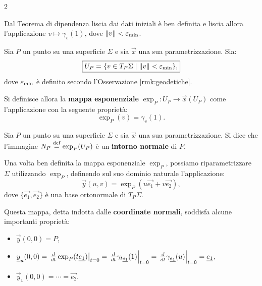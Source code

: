 \begin{multicols*}{2}
\begin{remark}
        Dal Teorema di dipendenza liscia dai dati iniziali è ben definita e liscia allora l'applicazione
        $v \mapsto \gamma_v(1)$, dove $\left\lVert v \right\rVert < \varepsilon_{\textnormal{min}}$.
    \end{remark}

    \begin{definition}
        Sia $P$ un punto su una superficie $\Sigma$ e sia $\vec{x}$ una sua parametrizzazione.
        Sia:
        \[
            \boxed{U_P = \{ v \in T_P \Sigma \mid \left\lVert v \right\rVert < \varepsilon_{\textnormal{min}} \},}
        \]
        dove $\varepsilon_{\textnormal{min}}$ è definito secondo l'Osservazione \ref{rmk:geodetiche}. \smallskip

        Si definisce allora la \textbf{mappa esponenziale} $\exp_P : U_P \to \vec{x}(U_P)$ come l'applicazione
        con la seguente proprietà:
        \[
            \boxed{\exp_P(v) = \gamma_v(1).}
        \]
    \end{definition}

    \begin{definition}
        Sia $P$ un punto su una superficie $\Sigma$ e sia $\vec{x}$ una sua parametrizzazione.
        Si dice che l'immagine $N_P \overset{\mathrm{def}}{=} \exp_P(U_P)$ è un \textbf{intorno normale} di $P$.
    \end{definition}

    \begin{remark}
        Una volta ben definita la mappa esponenziale $\exp_P$, possiamo riparametrizzare
        $\Sigma$ utilizzando $\exp_P$, definendo sul suo dominio naturale l'applicazione:
        \[
            \vec{y}(u, v) = \exp_P(u \vec{e_1} + v \vec{e_2}),
        \]
        dove $\{\vec{e_1}, \vec{e_2}\}$ è una base ortonormale di $T_P \Sigma$. \smallskip

        Questa mappa, detta indotta dalle \textbf{coordinate normali}, soddisfa alcune
        importanti proprietà:
        \begin{itemize}
            \item $\vec{y}(0, 0) = P$,
            \item $\vec{y}_u(0, 0) = \dertime{\exp_P(t \vec{e_1})}{t=0} =
                      \dertime{\gamma_{t \vec{e_1}}(1)}{t=0} =
                      \dertime{\gamma_{\vec{e_1}} (u)}{t=0} = \vec{e_1}$,
            \item $\vec{y}_v(0, 0) = \cdots = \vec{e_2}$.
        \end{itemize}
    \end{remark}


\end{multicols*}
